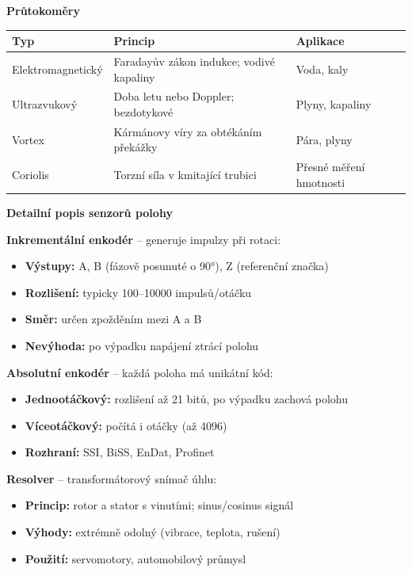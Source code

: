 \documentclass[a4paper,10pt]{article}
\begin{document}
\begin{vysvetlenibox}
\textbf{Průtokoměry}

\begin{center}
\begin{tabularx}{0.95\linewidth}{@{} l X l @{}}
    \toprule
    \textbf{Typ} & \textbf{Princip} & \textbf{Aplikace} \\
    \midrule
    Elektromagnetický & Faradayův zákon indukce; vodivé kapaliny & Voda, kaly \\
    Ultrazvukový      & Doba letu nebo Doppler; bezdotykové & Plyny, kapaliny \\
    Vortex            & Kármánovy víry za obtékáním překážky & Pára, plyny \\
    Coriolis          & Torzní síla v kmitající trubici & Přesné měření hmotnosti \\
    \bottomrule
\end{tabularx}
\end{center}

\textbf{Detailní popis senzorů polohy}

\textbf{Inkrementální enkodér} -- generuje impulzy při rotaci:
\begin{itemize}[noitemsep, leftmargin=1.4em, topsep=4pt]
    \item \textbf{Výstupy:} A, B (fázově posunuté o 90°), Z (referenční značka)
    \item \textbf{Rozlišení:} typicky 100--10000 impulsů/otáčku
    \item \textbf{Směr:} určen zpožděním mezi A a B
    \item \textbf{Nevýhoda:} po výpadku napájení ztrácí polohu
\end{itemize}

\textbf{Absolutní enkodér} -- každá poloha má unikátní kód:
\begin{itemize}[noitemsep, leftmargin=1.4em, topsep=4pt]
    \item \textbf{Jednootáčkový:} rozlišení až 21 bitů, po výpadku zachová polohu
    \item \textbf{Víceotáčkový:} počítá i otáčky (až 4096)
    \item \textbf{Rozhraní:} SSI, BiSS, EnDat, Profinet
\end{itemize}

\textbf{Resolver} -- transformátorový snímač úhlu:
\begin{itemize}[noitemsep, leftmargin=1.4em, topsep=4pt]
    \item \textbf{Princip:} rotor a stator s vinutími; sinus/cosinus signál
    \item \textbf{Výhody:} extrémně odolný (vibrace, teplota, rušení)
    \item \textbf{Použití:} servomotory, automobilový průmysl
\end{itemize}


\end{vysvetlenibox}
\end{document}
